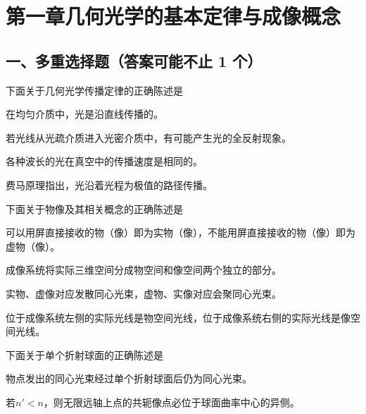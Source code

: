 \documentclass[standard, analysis, notocnum]{ExBook}
\newcommand{\answerarea}[1][8cm]{%
  \par\vspace{2mm}%
  \noindent{\color{themeColor!35}\rule{\linewidth}{0.4pt}}\par
  \noindent\begin{minipage}[t][#1][t]{\linewidth}\vspace{0pt}\end{minipage}\par
  \noindent{\color{themeColor!35}\rule{\linewidth}{0.4pt}}\par
}
\begin{document}


\section{第一章\quad 几何光学的基本定律与成像概念}
\subsection{一、多重选择题（答案可能不止 1 个）}
\begin{qitems}
\begin{bbox}
\qitem 下面关于几何光学传播定律的正确陈述是
\par\noindent\hspace{2em}在均匀介质中，光是沿直线传播的。
\par\noindent\hspace{2em}若光线从光疏介质进入光密介质中，有可能产生光的全反射现象。
\par\noindent\hspace{2em}各种波长的光在真空中的传播速度是相同的。
\par\noindent\hspace{2em}费马原理指出，光沿着光程为极值的路径传播。
\answerarea[3.5cm]
\end{bbox}
\begin{bbox}
\qitem 下面关于物像及其相关概念的正确陈述是
\par\noindent\hspace{2em}可以用屏直接接收的物（像）即为实物（像），不能用屏直接接收的物（像）即为虚物（像）。
\par\noindent\hspace{2em}成像系统将实际三维空间分成物空间和像空间两个独立的部分。
\par\noindent\hspace{2em}实物、虚像对应发散同心光束，虚物、实像对应会聚同心光束。
\par\noindent\hspace{2em}位于成像系统左侧的实际光线是物空间光线，位于成像系统右侧的实际光线是像空间光线。
\answerarea[3.5cm]
\end{bbox}
\begin{bbox}
\qitem 下面关于单个折射球面的正确陈述是
\par\noindent\hspace{2em}物点发出的同心光束经过单个折射球面后仍为同心光束。
\par\noindent\hspace{2em}若$n'<n$，则无限远轴上点的共轭像点必位于球面曲率中心的异侧。

\end{bbox}
\end{qitems}
\end{document}
